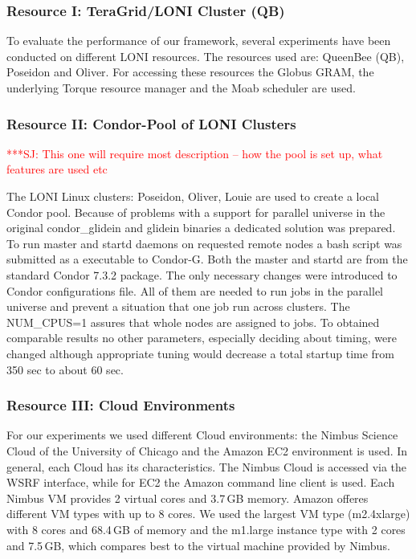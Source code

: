 \documentclass[conference,final]{IEEEtran}
\newcommand{\jhanote}[1]{ {\textcolor{red} { ***SJ: #1 }}}
\newcommand{\jhanote}[1]{}
\begin{document}
\subsubsection*{Resource I: TeraGrid/LONI Cluster (QB)}

To evaluate the performance of our framework, several experiments 
have been conducted on different LONI resources. The resources used are: 
QueenBee (QB), Poseidon and Oliver. For accessing these resources
the Globus GRAM, the underlying Torque resource manager and the Moab scheduler are used.

\subsubsection*{Resource II: Condor-Pool of LONI Clusters}

\jhanote{This one will require most description -- how the pool is set
up, what features are used etc}

The LONI Linux clusters: Poseidon, Oliver, Louie are used to create a local
Condor pool. Because of problems with a support for parallel universe in the
original condor\_glidein and glidein binaries a dedicated solution was prepared.
To run master and startd daemons on requested remote nodes a bash script was
submitted as a executable to Condor-G. Both the master and startd are from the
standard Condor 7.3.2 package. The only necessary changes were introduced to
Condor configurations file. All of them are needed to run jobs in the parallel
universe and prevent a situation that one job run across clusters. The NUM\_CPUS=1
assures that whole nodes are assigned to jobs.
To obtained comparable results no other parameters, especially deciding about
timing, were changed although appropriate tuning would decrease a total
startup time from 350 sec to about 60 sec.


\subsubsection*{Resource III: Cloud Environments}

For our experiments we used different Cloud environments: 
the Nimbus Science Cloud of the University of Chicago and the 
Amazon EC2 environment is used. In general, each Cloud has 
its characteristics. The Nimbus Cloud is accessed via the WSRF
interface, while for EC2 the Amazon command line 
client is used. Each Nimbus VM provides 2 virtual cores and 3.7\,GB memory. 
Amazon offeres different VM types with up to 8 cores. We used 
the largest VM type (m2.4xlarge) with 8 cores and 68.4\,GB of memory
and the m1.large instance type with 2 cores and 7.5\,GB, which compares
best to the virtual machine provided by Nimbus. 
\end{document}
